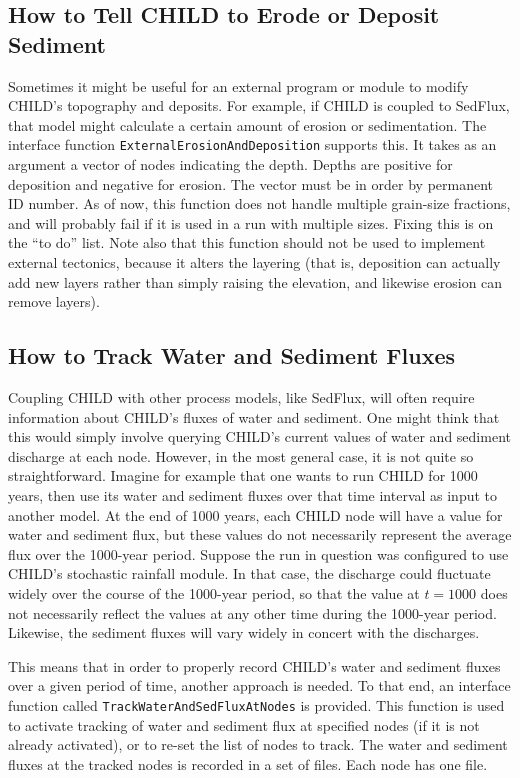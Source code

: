 \documentclass[12pt]{article}
\begin{document}
\subsection{How to Tell CHILD to Erode or Deposit Sediment}

Sometimes it might be useful for an external program or module to modify CHILD's topography and deposits. For example, if CHILD is coupled to SedFlux, that model might calculate a certain amount of erosion or sedimentation. The interface function {\tt ExternalErosionAndDeposition} supports this. It takes as an argument a vector of nodes indicating the depth. Depths are positive for deposition and negative for erosion. The vector must be in order by permanent ID number. As of now, this function does not handle multiple grain-size fractions, and will probably fail if it is used in a run with multiple sizes. Fixing this is on the ``to do'' list. Note also that this function should not be used to implement external tectonics, because it alters the layering (that is, deposition can actually add new layers rather than simply raising the elevation, and likewise erosion can remove layers).

\subsection{How to Track Water and Sediment Fluxes}

Coupling CHILD with other process models, like SedFlux, will often require information about CHILD's fluxes of water and sediment. One might think that this would simply involve querying CHILD's current values of water and sediment discharge at each node. However, in the most general case, it is not quite so straightforward. Imagine for example that one wants to run CHILD for 1000 years, then use its water and sediment fluxes over that time interval as input to another model. At the end of 1000 years, each CHILD node will have a value for water and sediment flux, but these values do not necessarily represent the average flux over the 1000-year period. Suppose the run in question was configured to use CHILD's stochastic rainfall module. In that case, the discharge could fluctuate widely over the course of the 1000-year period, so that the value at $t=1000$ does not necessarily reflect the values at any other time during the 1000-year period. Likewise, the sediment fluxes will vary widely in concert with the discharges.

This means that in order to properly record CHILD's water and sediment fluxes over a given period of time, another approach is needed. To that end, an interface function called {\tt TrackWaterAndSedFluxAtNodes} is provided. This function is used to activate tracking of water and sediment flux at specified nodes (if it is not already activated), or to re-set the list of nodes to track. The water and sediment fluxes at the tracked nodes is recorded in 
a set of files. Each node has one file.
\end{document}
